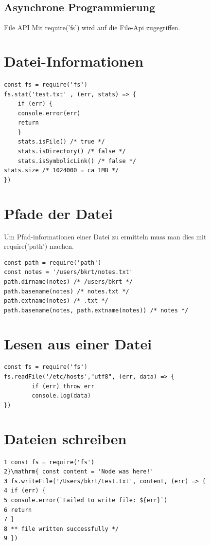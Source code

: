 \subsection{Asynchrone Programmierung}

\begin{definition}{File API}
    Mit require('fs') wird auf die File-Api zugegriffen.
\end{definition}

\section*{Datei-Informationen}
\begin{verbatim}
const fs = require('fs')
fs.stat('test.txt' , (err, stats) => {
    if (err) {
    console.error(err)
    return
    }
    stats.isFile() /* true */
    stats.isDirectory() /* false */
    stats.isSymbolicLink() /* false */
stats.size /* 1024000 = ca 1MB */
})
\end{verbatim}

\section*{Pfade der Datei}
Um Pfad-informationen einer Datei zu ermitteln muss man dies mit require('path') machen.

\begin{verbatim}
const path = require('path')
const notes = '/users/bkrt/notes.txt'
path.dirname(notes) /* /users/bkrt */
path.basename(notes) /* notes.txt */
path.extname(notes) /* .txt */
path.basename(notes, path.extname(notes)) /* notes */
\end{verbatim}

\section*{Lesen aus einer Datei}
\begin{verbatim}
const fs = require('fs')
fs.readFile('/etc/hosts',"utf8", (err, data) => {
        if (err) throw err
        console.log(data)
})
\end{verbatim}

\section*{Dateien schreiben}
\begin{verbatim}
1 const fs = require('fs')
2}\mathrm{ const content = 'Node was here!'
3 fs.writeFile('/Users/bkrt/test.txt', content, (err) => {
4 if (err) {
5 console.error(`Failed to write file: ${err}`)
6 return
7 }
8 ** file written successfully */
9 })
\end{verbatim}

